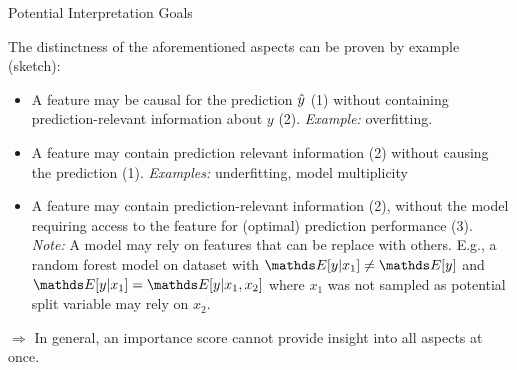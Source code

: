\documentclass[11pt,compress,t,notes=noshow, xcolor=table]{beamer}
\begin{document}
\begin{vbframe}{Potential Interpretation Goals}

The distinctness of the aforementioned aspects can be proven by example (sketch):

\begin{itemize}
  \item A feature may be causal for the prediction $\yh$ (1) without containing prediction-relevant information about $y$ (2). \textit{Example:} overfitting.
  \item A feature may contain prediction relevant information (2) without causing the prediction (1).  \textit{Examples:} underfitting, model multiplicity
  \item A feature may contain prediction-relevant information (2), without the model requiring access to the feature for (optimal) prediction performance (3).\\
  \textit{Note:} A model may rely on features that can be replace with others. E.g., a random forest model on dataset with $\E[y|x_1] \neq \E[y]$ and $\E[y|x_1] = \E[y|x_1, x_2]$ where $x_1$ was not sampled as potential split variable may rely on $x_2$.
  \end{itemize}
$\Rightarrow$ In general, an importance score cannot provide insight into all aspects at once.
\end{vbframe}

\endlecture
\end{document}
